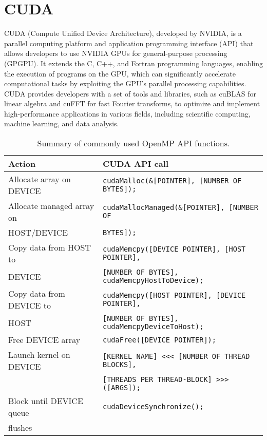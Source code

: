 \section{CUDA}
CUDA (Compute Unified Device Architecture), developed by NVIDIA, is a parallel computing platform and application programming interface (API) that allows developers to use NVIDIA GPUs for general-purpose processing (GPGPU). It extends the C, C++, and Fortran programming languages, enabling the execution of programs on the GPU, which can significantly accelerate computational tasks by exploiting the GPU's parallel processing capabilities. CUDA provides developers with a set of tools and libraries, such as cuBLAS for linear algebra and cuFFT for fast Fourier transforms, to optimize and implement high-performance applications in various fields, including scientific computing, machine learning, and data analysis.

\begin{table}[h]
    \caption{Summary of commonly used OpenMP API functions.}
    \centering
    \begin{tabular}{l|l}
        \hline
        \textbf{Action} & \textbf{CUDA API call} \\ \hline
        Allocate array on DEVICE & \texttt{cudaMalloc(\&[POINTER], [NUMBER OF BYTES]);} \\ \hline
        Allocate managed array on  & \texttt{cudaMallocManaged(\&[POINTER], [NUMBER OF} \\
        HOST/DEVICE & \texttt{BYTES]);}
        \\ \hline
        Copy data from HOST to  & \texttt{cudaMemcpy([DEVICE POINTER], [HOST POINTER], } \\ 
        DEVICE & \texttt{[NUMBER OF BYTES], cudaMemcpyHostToDevice);} \\
        \hline
        Copy data from DEVICE to  & \texttt{cudaMemcpy([HOST POINTER], [DEVICE POINTER], } \\
        HOST & \texttt{[NUMBER OF BYTES], cudaMemcpyDeviceToHost);}
        \\ \hline
        Free DEVICE array & \texttt{cudaFree([DEVICE POINTER]);} \\ \hline
        Launch kernel on DEVICE & \texttt{[KERNEL NAME] <<< [NUMBER OF THREAD BLOCKS], } \\ 
        & \texttt{[THREADS PER THREAD-BLOCK] >>>([ARGS]);} \\
        \hline
        Block until DEVICE queue & \texttt{cudaDeviceSynchronize();} \\ 
        flushes & \\ 
        \hline
    \end{tabular}
\end{table}

